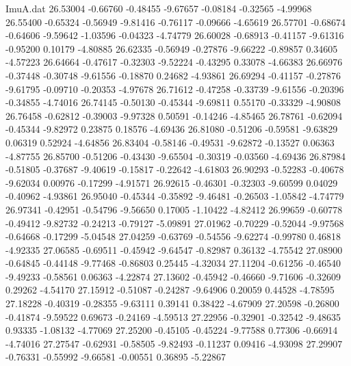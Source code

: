 \begin{filecontents}{ImuA.dat}
  26.53004   -0.66760   -0.48455   -9.67657   -0.08184   -0.32565   -4.99968
  26.55400   -0.65324   -0.56949   -9.81416   -0.76117   -0.09666   -4.65619
  26.57701   -0.68674   -0.64606   -9.59642   -1.03596   -0.04323   -4.74779
  26.60028   -0.68913   -0.41157   -9.61316   -0.95200    0.10179   -4.80885
  26.62335   -0.56949   -0.27876   -9.66222   -0.89857    0.34605   -4.57223
  26.64664   -0.47617   -0.32303   -9.52224   -0.43295    0.33078   -4.66383
  26.66976   -0.37448   -0.30748   -9.61556   -0.18870    0.24682   -4.93861
  26.69294   -0.41157   -0.27876   -9.61795   -0.09710   -0.20353   -4.97678
  26.71612   -0.47258   -0.33739   -9.61556   -0.20396   -0.34855   -4.74016
  26.74145   -0.50130   -0.45344   -9.69811    0.55170   -0.33329   -4.90808
  26.76458   -0.62812   -0.39003   -9.97328    0.50591   -0.14246   -4.85465
  26.78761   -0.62094   -0.45344   -9.82972    0.23875    0.18576   -4.69436
  26.81080   -0.51206   -0.59581   -9.63829    0.06319    0.52924   -4.64856
  26.83404   -0.58146   -0.49531   -9.62872   -0.13527    0.06363   -4.87755
  26.85700   -0.51206   -0.43430   -9.65504   -0.30319   -0.03560   -4.69436
  26.87984   -0.51805   -0.37687   -9.40619   -0.15817   -0.22642   -4.61803
  26.90293   -0.52283   -0.40678   -9.62034    0.00976   -0.17299   -4.91571
  26.92615   -0.46301   -0.32303   -9.60599    0.04029   -0.40962   -4.93861
  26.95040   -0.45344   -0.35892   -9.46481   -0.26503   -1.05842   -4.74779
  26.97341   -0.42951   -0.54796   -9.56650    0.17005   -1.10422   -4.82412
  26.99659   -0.60778   -0.49412   -9.82732   -0.24213   -0.79127   -5.09891
  27.01962   -0.70229   -0.52044   -9.97568   -0.64668   -0.17299   -5.04548
  27.04259   -0.63769   -0.54556   -9.62274   -0.99780    0.46818   -4.92335
  27.06585   -0.69511   -0.45942   -9.64547   -0.82987    0.36132   -4.75542
  27.08900   -0.64845   -0.44148   -9.77468   -0.86803    0.25445   -4.32034
  27.11204   -0.61256   -0.46540   -9.49233   -0.58561    0.06363   -4.22874
  27.13602   -0.45942   -0.46660   -9.71606   -0.32609    0.29262   -4.54170
  27.15912   -0.51087   -0.24287   -9.64906    0.20059    0.44528   -4.78595
  27.18228   -0.40319   -0.28355   -9.63111    0.39141    0.38422   -4.67909
  27.20598   -0.26800   -0.41874   -9.59522    0.69673   -0.24169   -4.59513
  27.22956   -0.32901   -0.32542   -9.48635    0.93335   -1.08132   -4.77069
  27.25200   -0.45105   -0.45224   -9.77588    0.77306   -0.66914   -4.74016
  27.27547   -0.62931   -0.58505   -9.82493   -0.11237    0.09416   -4.93098
  27.29907   -0.76331   -0.55992   -9.66581   -0.00551    0.36895   -5.22867

\end{filecontents}
